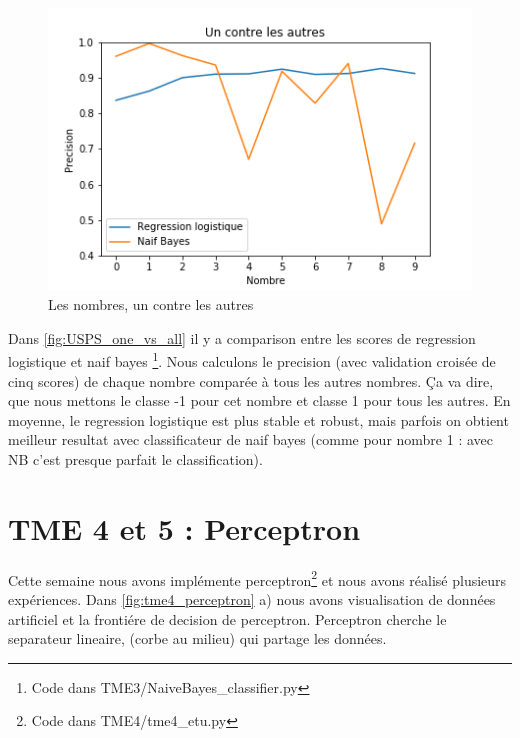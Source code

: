 \documentclass[a4paper,12pt]{article}
\begin{document}
\begin{figure}[h!]
\caption{Les nombres, un contre les autres}
\label{fig:USPS_one_vs_all}
\includegraphics[width=0.5\linewidth]{images/tme3/USPS_one_vs_all.png}
\centering
\end{figure}%

Dans \autoref{fig:USPS_one_vs_all} il y a comparison entre les scores de regression logistique et naif bayes
\footnote{Code dans TME3\slash NaiveBayes\_classifier.py}. Nous calculons le precision (avec validation croisée de cinq scores)
de chaque nombre comparée à tous les autres nombres. Ça va dire, que nous mettons le classe -1 pour cet nombre et classe 1 pour tous les autres.
En moyenne, le regression logistique est plus stable et robust, mais parfois on obtient meilleur resultat avec classificateur
de naif bayes (comme pour nombre 1 : avec NB c'est presque parfait le classification).

\section{TME 4 et 5 : Perceptron}

Cette semaine nous avons implémente perceptron\footnote{Code dans TME4\slash tme4\_etu.py}
et nous avons réalisé plusieurs expériences. Dans \autoref{fig:tme4_perceptron} a) nous avons visualisation de
données artificiel et la frontiére de decision de perceptron. Perceptron cherche le separateur lineaire, (corbe au milieu)
qui partage les données.
\end{document}
